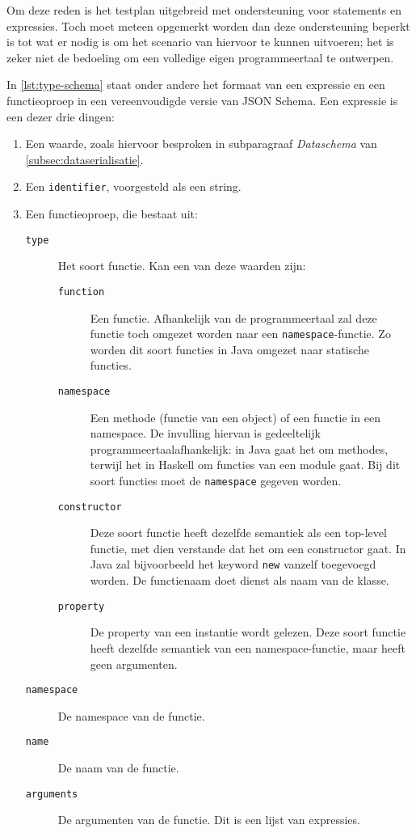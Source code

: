 \inputminted{java}{code/assignment.jshell}

Om deze reden is het testplan uitgebreid met ondersteuning voor statements en expressies.
Toch moet meteen opgemerkt worden dan deze ondersteuning beperkt is tot wat er nodig is om het scenario van hiervoor te kunnen uitvoeren;
het is zeker niet de bedoeling om een volledige eigen programmeertaal te ontwerpen.

In \cref{lst:type-schema} staat onder andere het formaat van een expressie en een functieoproep in een vereenvoudigde versie van JSON Schema.
Een expressie is een dezer drie dingen:
\begin{enumerate}
    \item Een waarde, zoals hiervoor besproken in subparagraaf \emph{Dataschema} van \cref{subsec:dataserialisatie}.
    \item Een \texttt{identifier}, voorgesteld als een string.
    \item Een functieoproep, die bestaat uit:
    \begin{description}
        \item[\texttt{type}] Het soort functie.
        Kan een van deze waarden zijn:
        \begin{description}
            \item[\texttt{function}] Een  functie.
            Afhankelijk van de programmeertaal zal deze functie toch omgezet worden naar een \texttt{namespace}-functie.
            Zo worden dit soort functies in Java omgezet naar statische functies.
            \item[\texttt{namespace}] Een methode (functie van een object) of een functie in een namespace.
            De invulling hiervan is gedeeltelijk programmeertaalafhankelijk: in Java gaat het om methodes, terwijl het in Haskell om functies van een module gaat.
            Bij dit soort functies moet de \texttt{namespace} gegeven worden.
            \item[\texttt{constructor}] Deze soort functie heeft dezelfde semantiek als een top-level functie, met dien verstande dat het om een constructor gaat.
            In Java zal bijvoorbeeld het keyword \texttt{new} vanzelf toegevoegd worden.
            De functienaam doet dienst als naam van de klasse.
            \item[\texttt{property}] De property van een instantie wordt gelezen.
            Deze soort functie heeft dezelfde semantiek van een namespace-functie, maar heeft geen argumenten.
        \end{description}
        \item[\texttt{namespace}] De namespace van de functie.
        \item[\texttt{name}] De naam van de functie.
        \item[\texttt{arguments}] De argumenten van de functie.
        Dit is een lijst van expressies.
    \end{description}
\end{enumerate}


